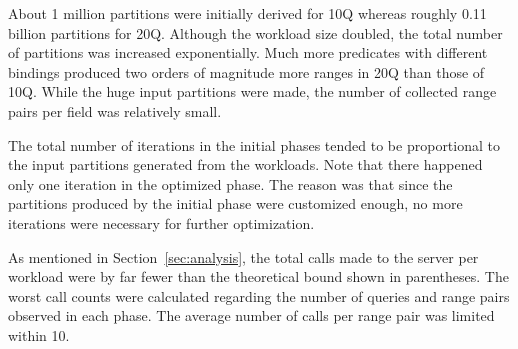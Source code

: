 \documentclass[paper]{ieice}
\begin{document}
About 1 million partitions were initially derived for 10Q whereas roughly 0.11 billion partitions for 20Q. 
Although the workload size doubled, the total number of partitions was increased exponentially. 
Much more predicates with different bindings produced two orders of magnitude more ranges in 20Q than those of 10Q. 
While the huge input partitions were made, the number of collected range pairs per field was relatively small. 

The total number of iterations in the initial phases 
tended to be proportional to the input \hbox{partitions} 
\hbox{generated} from the workloads. 
Note that there \hbox{happened} only one iteration in the optimized phase. 
The reason was that since the partitions produced by the \hbox{initial} phase were customized enough, 
no more \hbox{iterations} were \hbox{necessary} for further optimization. 

As mentioned in Section~\ref{sec:analysis}, the total calls made to 
the server per workload were by far fewer than the theoretical bound shown in parentheses. 
The worst call counts were calculated regarding the number of queries and range pairs observed in each phase. 
The average number of calls per range pair was limited within 10. %
\end{document}
